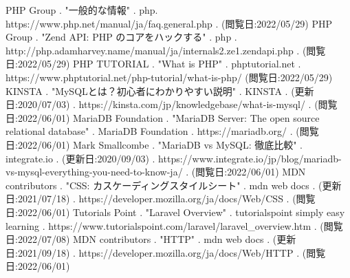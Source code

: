 \documentclass[submit,techrep]{ipsj}
\begin{document}
\begin{thebibliography}{9}
 PHP Group . "一般的な情報" . php. https://www.php.net/manual/ja/faq.general.php . (閲覧日:2022/05/29)
 PHP Group . "Zend API: PHP のコアをハックする" . php . http://php.adamharvey.name/manual/ja/internals2.ze1.zendapi.php . (閲覧日:2022/05/29)
 PHP TUTORIAL . "What is PHP" . phptutorial.net . https://www.phptutorial.net/php-tutorial/what-is-php/ (閲覧日:2022/05/29)
 KINSTA . "MySQLとは？初心者にわかりやすい説明" . KINSTA . (更新日:2020/07/03) . https://kinsta.com/jp/knowledgebase/what-is-mysql/ . (閲覧日:2022/06/01)
 MariaDB Foundation . "MariaDB Server: The open source relational database" . MariaDB Foundation . https://mariadb.org/ . (閲覧日:2022/06/01)
 Mark Smallcombe . "MariaDB vs MySQL: 徹底比較" . integrate.io . (更新日:2020/09/03) . https://www.integrate.io/jp/blog/mariadb-vs-mysql-everything-you-need-to-know-ja/ . (閲覧日:2022/06/01)
 MDN contributors . "CSS: カスケーディングスタイルシート" . mdn web docs . (更新日:2021/07/18) . https://developer.mozilla.org/ja/docs/Web/CSS . (閲覧日:2022/06/01)
 Tutorials Point . "Laravel Overview" . tutorialspoint simply easy learning . https://www.tutorialspoint.com/laravel/laravel\_overview.htm . (閲覧日:2022/07/08)
 MDN contributors . "HTTP" . mdn web docs . (更新日:2021/09/18) . https://developer.mozilla.org/ja/docs/Web/HTTP . (閲覧日:2022/06/01)
\end{thebibliography}
\end{document}
